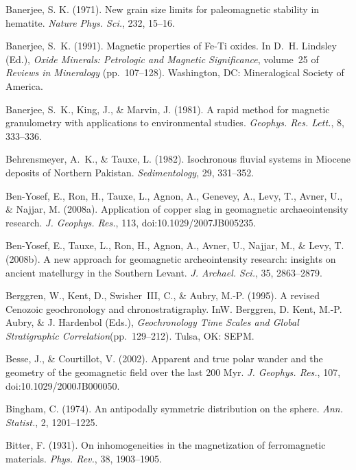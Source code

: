 \documentclass[,plain]{tauxe}
\begin{document}
\begin{thebibliography}{}
\bibitem{}%
Banerjee, S. K. (1971). New grain size limits for paleomagnetic
stability in hematite. {\it Nature Phys. Sci.}, 232, 15--16.

\bibitem{}%
Banerjee, S.~K. (1991). Magnetic properties of Fe-Ti oxides. In D.~H.
Lindsley (Ed.), {\it Oxide Minerals: Petrologic and Magnetic Significance}, volume~25 of {\it Reviews in Mineralogy} (pp.\ 107--128). Washington, DC: Mineralogical Society of America.

\bibitem{}%
Banerjee, S.~K., King, J., \& Marvin, J. (1981). A rapid method for magnetic granulometry with applications to environmental studies. {\it Geophys. Res. Lett.}, 8, 333--336.

\bibitem{}%
Behrensmeyer, A.~K., \& Tauxe, L. (1982). Isochronous fluvial systems in Miocene deposits of Northern Pakistan. {\it Sedimentology}, 29, 331--352.

\bibitem{}%
Ben-Yosef, E., Ron, H., Tauxe, L., Agnon, A., Genevey, A., Levy, T., Avner, U., \& Najjar, M. (2008a). Application of copper slag in geomagnetic archaeointensity research. {\it J. Geophys. Res.}, 113, doi:10.1029/2007JB005235.

\bibitem{}%
Ben-Yosef, E., Tauxe, L., Ron, H., Agnon, A., Avner, U., Najjar, M., \& Levy, T. (2008b). A new approach for geomagnetic archeointensity research: insights on ancient matellurgy in the Southern Levant. {\it J. Archael. Sci.}, 35, 2863--2879.

\bibitem{}%
Berggren, W., Kent, D., Swisher~III, C., \& Aubry, M.-P. (1995). A revised Cenozoic geochronology and chronostratigraphy. In\break W. Berggren, D. Kent, M.-P. Aubry, \& J. Hardenbol (Eds.), {\it Geochronology Time Scales and Global Stratigraphic Correlation}\break (pp.\ 129--212). Tulsa, OK: SEPM.

\bibitem{}%
Besse, J., \& Courtillot, V. (2002). Apparent and true polar wander and the geometry of the geomagnetic field over the last 200 Myr. {\it J. Geophys. Res.}, 107, doi:10.1029/2000JB000050.

\bibitem{}%
Bingham, C. (1974). An antipodally symmetric distribution on the sphere. {\it Ann. Statist.}, 2, 1201--1225.

\bibitem{}%
Bitter, F. (1931). On inhomogeneities in the magnetization of ferromagnetic materials. {\it Phys. Rev.}, 38, 1903--1905.


\end{thebibliography}
\end{document}
